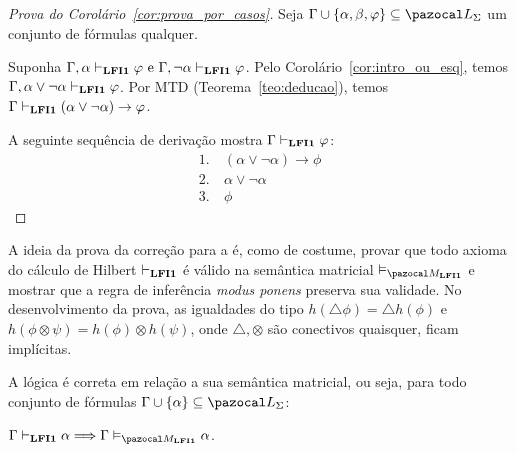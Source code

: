     \begin{proof}[Prova do Corolário~\ref{cor:prova_por_casos}]
        Seja $\Gamma \cup \{\alpha, \beta, \phi\} \subseteq \ling{}$ um conjunto de fórmulas qualquer.

        Suponha $\Gamma, \alpha \vdash_{{\normalfont\textbf{LFI1}}{}} \varphi \text{ e }\Gamma, \neg\alpha \vdash_{{\normalfont\textbf{LFI1}}{}} \varphi$. Pelo Corolário~\ref{cor:intro_ou_esq}, temos $\Gamma, \alpha \lor \neg \alpha \vdash_{{\normalfont\textbf{LFI1}}{}} \varphi$. Por MTD (Teorema~\ref{teo:deducao}), temos $\Gamma \vdash_{{\normalfont\textbf{LFI1}}{}} (\alpha \lor \neg \alpha) \to \varphi$.

        A seguinte sequência de derivação mostra $\Gamma\vdash_{{\normalfont\textbf{LFI1}}{}} \varphi$:
        \begin{align*}
            1. ~& (\alpha \lor \neg \alpha) \to \phi\tag{MTD aplicado à suposição} \\
            2. ~& \alpha \lor \neg \alpha \tag{Ax10} \\
            3. ~& \phi \tag{MP 1,2}
        \end{align*}
    \end{proof}

    A ideia da prova da correção para a \lfium{} é, como de costume, provar que todo axioma do cálculo de Hilbert $\vdash_{{\normalfont\textbf{LFI1}}{}}$ é válido na semântica matricial $\conmat$ e mostrar que a regra de inferência \textit{modus ponens} preserva sua validade. No desenvolvimento da prova, as igualdades do tipo $h(\triangle \phi) = \triangle h(\phi)$ e $h(\phi \otimes \psi) = h(\phi) \otimes h(\psi)$, onde $\triangle, \otimes$ são conectivos quaisquer, ficam implícitas.


    \begin{teorema}\label{teo:correcao_mat}
        A lógica {\normalfont\lfium{}} é correta em relação a sua semântica matricial, ou seja, para todo conjunto de fórmulas $\Gamma \cup \{\alpha\} \subseteq \ling{}$:

        \centering
        {\normalfont{} $\Gamma \conhil \alpha \Longrightarrow \Gamma \conmat \alpha$.}
    \end{teorema}


